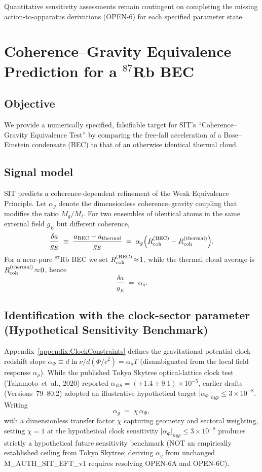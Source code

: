 \documentclass[american,11pt,letterpaper]{article}
\def\mathcal#1{#1}%
\def\mathrm#1{#1}%
\def\texttt#1{#1}%
\def\emph#1{#1}%
\begin{document}
Quantitative sensitivity assessments remain contingent on completing the missing action-to-apparatus derivations (\texttt{OPEN-6}) for each specified parameter state.

\section{Coherence--Gravity Equivalence Prediction for a \texorpdfstring{$^{87}$}{87}Rb BEC}
\label{appendix:E-BEC}
\label{app:BEC-benchmark}

\subsection{Objective}
We provide a numerically specified, falsifiable target for SIT's ``Coherence--Gravity Equivalence Test'' by comparing the free-fall acceleration of a Bose--Einstein condensate (BEC) to that of an otherwise identical thermal cloud.

\subsection{Signal model}
SIT predicts a coherence-dependent refinement of the Weak Equivalence Principle. Let $\alpha_g$ denote the dimensionless coherence--gravity coupling that modifies the ratio $M_g/M_i$. For two ensembles of identical atoms in the same external field $g_E$ but different coherence,
\[
\frac{\delta a}{g_E} \;\equiv\; \frac{a_{\rm BEC}-a_{\rm thermal}}{g_E}
\;=\; \alpha_g\Big(R_{\rm coh}^{\rm (BEC)} - R_{\rm coh}^{\rm (thermal)}\Big).
\]
For a near-pure $^{87}$Rb BEC we set $R_{\rm coh}^{\rm (BEC)}\!\approx\!1$, while the thermal cloud average is $R_{\rm coh}^{\rm (thermal)}\!\approx\!0$, hence
\[
\frac{\delta a}{g_E} \;=\; \alpha_g.
\]

\subsection{Identification with the clock-sector parameter (Hypothetical Sensitivity Benchmark)}
Appendix~\ref{appendix:ClockConstraints} defines the gravitational-potential clock-redshift slope
\(\alpha_\Phi \equiv d\ln\nu/d(\Phi/c^{2}) = \alpha_\rho\mathcal{T}\) (disambiguated from the local field response \(\alpha_\rho\)). While the published Tokyo Skytree optical-lattice clock test (Takamoto~\emph{et~al.}, 2020) reported \(\alpha_{\mathrm{RS}} = (+1.4 \pm 9.1)\times 10^{-5}\), earlier drafts (Versions~79--80.2) adopted an illustrative hypothetical target \(|\alpha_\Phi|_{\mathrm{hyp}} \le 3\times 10^{-8}\). Writing
\[
\alpha_g \;=\; \chi\,\alpha_\Phi,
\]
with a dimensionless transfer factor $\chi$ capturing geometry and sectoral weighting, setting $\chi = 1$ at the hypothetical clock sensitivity $|\alpha_\Phi|_{\mathrm{hyp}} \le 3\times 10^{-8}$ produces strictly a \emph{hypothetical future sensitivity benchmark} (NOT an empirically established ceiling from Tokyo Skytree; deriving $\alpha_g$ from unchanged \texttt{M\_AUTH\_SIT\_EFT\_v1} requires resolving \texttt{OPEN-6A} and \texttt{OPEN-6C}).
\end{document}
